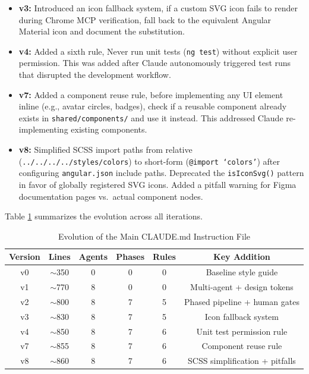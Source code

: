 \begin{itemize}
    \item \textbf{v3:} Introduced an icon fallback system, if a custom SVG icon fails to render during Chrome MCP verification, fall back to the equivalent Angular Material icon and document the substitution.
    \item \textbf{v4:} Added a sixth rule, Never run unit tests (\texttt{ng test}) without explicit user permission. This was added after Claude autonomously triggered test runs that disrupted the development workflow.
    \item \textbf{v7:} Added a component reuse rule, before implementing any UI element inline (e.g., avatar circles, badges), check if a reusable component already exists in \texttt{shared/components/} and use it instead. This addressed Claude re-implementing existing components.
    \item \textbf{v8:} Simplified SCSS import paths from relative (\texttt{../../../../styles/colors}) to short-form (\texttt{@import `colors'}) after configuring \texttt{angular.json} include paths. Deprecated the \texttt{isIconSvg()} pattern in favor of globally registered SVG icons. Added a pitfall warning for Figma documentation pages vs.\ actual component nodes.
\end{itemize}

Table \ref{tab:prompt_evolution} summarizes the evolution across all iterations.

\begin{table}[H]
\centering
\caption{Evolution of the Main CLAUDE.md Instruction File}
\label{tab:prompt_evolution}
\begin{tabular}{|c|c|c|c|c|c|}
\hline
\textbf{Version} & \textbf{Lines} & \textbf{Agents} & \textbf{Phases} & \textbf{Rules} & \textbf{Key Addition} \\ \hline
v0 & $\sim$350 & 0 & 0 & 0 & Baseline style guide \\ \hline
v1 & $\sim$770 & 8 & 0 & 0 & Multi-agent + design tokens \\ \hline
v2 & $\sim$800 & 8 & 7 & 5 & Phased pipeline + human gates \\ \hline
v3 & $\sim$830 & 8 & 7 & 5 & Icon fallback system \\ \hline
v4 & $\sim$850 & 8 & 7 & 6 & Unit test permission rule \\ \hline
v7 & $\sim$855 & 8 & 7 & 6 & Component reuse rule \\ \hline
v8 & $\sim$860 & 8 & 7 & 6 & SCSS simplification + pitfalls \\ \hline
\end{tabular}
\end{table}

